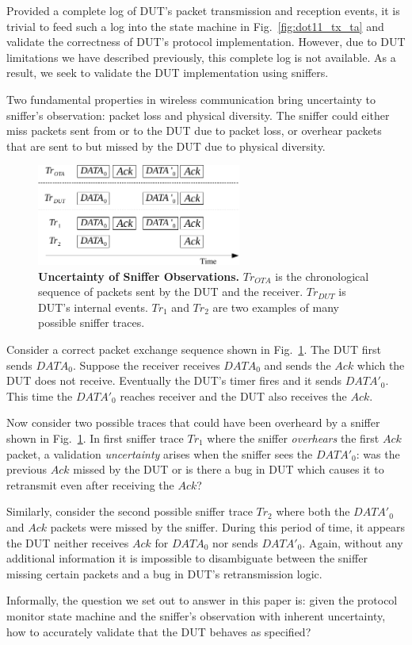 Provided a complete log of DUT's packet transmission and reception events, it is
trivial to feed such a log into the state machine in Fig.~\ref{fig:dot11_tx_ta}
and validate the correctness of DUT's protocol implementation. However, due to
DUT limitations we have described previously, this complete log is not
available. As a result, we seek to validate the DUT implementation using
sniffers.

Two fundamental properties in wireless communication bring uncertainty to
sniffer's observation: packet loss and physical diversity. The sniffer could
either miss packets sent from or to the DUT due to packet loss, or overhear packets
that are sent to but missed by the DUT due to physical diversity.

\begin{figure}[H]
  \vspace*{-3mm}
  \centering
  \includegraphics[width=0.6\textwidth]{./figures/false_pos.pdf}
  \caption{\textbf{Uncertainty of Sniffer Observations.} $Tr_{OTA}$ is
    the chronological sequence of packets sent by the DUT and the receiver.
    $Tr_{DUT}$ is DUT's internal events. $Tr_1$ and $Tr_2$ are two examples of
    many possible sniffer traces.}
  \label{fig:sniffer_in_middle}
  \vspace*{-5mm}
\end{figure}

Consider a correct packet exchange sequence shown in
Fig.~\ref{fig:sniffer_in_middle}. The DUT first sends $DATA_0$.  Suppose the
receiver receives $DATA_0$ and sends the $Ack$ which the DUT does not receive.
Eventually the DUT's timer fires and it sends $DATA'_0$.  This time the
$DATA'_0$ reaches receiver and the DUT also receives the $Ack$.

Now consider two possible traces that could have been overheard by a sniffer shown
in Fig.~\ref{fig:sniffer_in_middle}.
In first sniffer trace $Tr_1$ where the sniffer
\textit{overhears} the first $Ack$ packet, a validation \textit{uncertainty}
arises when the sniffer sees the $DATA'_0$: was the previous $Ack$ missed by the
DUT or is there a bug in DUT which causes it to retransmit even after receiving
the $Ack$?

Similarly, consider the second possible sniffer trace $Tr_2$
where both the $DATA'_0$ and $Ack$ packets were missed by the sniffer. During
this period of time, it appears the DUT neither receives $Ack$ for $DATA_0$ nor
sends $DATA'_0$. Again, without any additional information it is impossible to
disambiguate between the sniffer missing certain packets and a bug in DUT's
retransmission logic.

Informally, the question we set out to answer in this paper is: given the
protocol monitor state machine and the sniffer's observation with inherent
uncertainty, how to accurately validate that the DUT behaves as specified?
